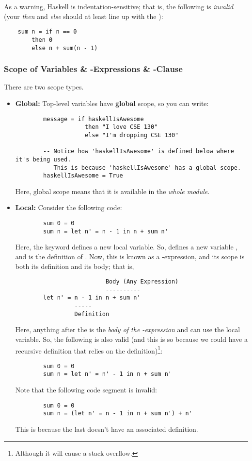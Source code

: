 \documentclass[letterpaper]{article}
\begin{document}
As a warning, Haskell is indentation-sensitive; that is, the following is \emph{invalid} (your \emph{then} and \emph{else} should at least line up with the ):
\begin{verbatim}
    sum n = if n == 0 
        then 0 
        else n + sum(n - 1)
\end{verbatim}

\subsubsection{Scope of Variables \& -Expressions \& -Clause}
There are two scope types. 
\begin{itemize}
    \item \textbf{Global:} Top-level variables have \textbf{global} scope, so you can write: 
    \begin{verbatim}
        message = if haskellIsAwesome 
                    then "I love CSE 130"
                    else "I'm dropping CSE 130"
        
        -- Notice how 'haskellIsAwesome' is defined below where it's being used.
        -- This is because 'haskellIsAwesome' has a global scope.
        haskellIsAwesome = True \end{verbatim}
    Here, global scope means that it is available in the \emph{whole module}.

    
    \item \textbf{Local:} Consider the following code: 
    \begin{verbatim}
        sum 0 = 0
        sum n = let n' = n - 1 in n + sum n'\end{verbatim}
    Here, the  keyword defines a new local variable. So,  defines a new variable , and  is the definition of . Now, this is known as a -expression, and its scope is both its definition and its body; that is, 
    \begin{verbatim}
                          Body (Any Expression)
                          ----------
        let n' = n - 1 in n + sum n' 
                 -----
                 Definition 
    \end{verbatim}
    Here, anything after the  is the \emph{body of the -expression} and can use the local variable. So, the following is also valid (and this is so because we could have a recursive definition that relies on the definition)\footnote{Although it will cause a stack overflow.}:
    \begin{verbatim}
        sum 0 = 0
        sum n = let n' = n' - 1 in n + sum n'\end{verbatim}
    Note that the following code segment is invalid: 
    \begin{verbatim}
        sum 0 = 0
        sum n = (let n' = n - 1 in n + sum n') + n'\end{verbatim}
    This is because the last  doesn't have an associated definition. 


\end{itemize}
\end{document}
